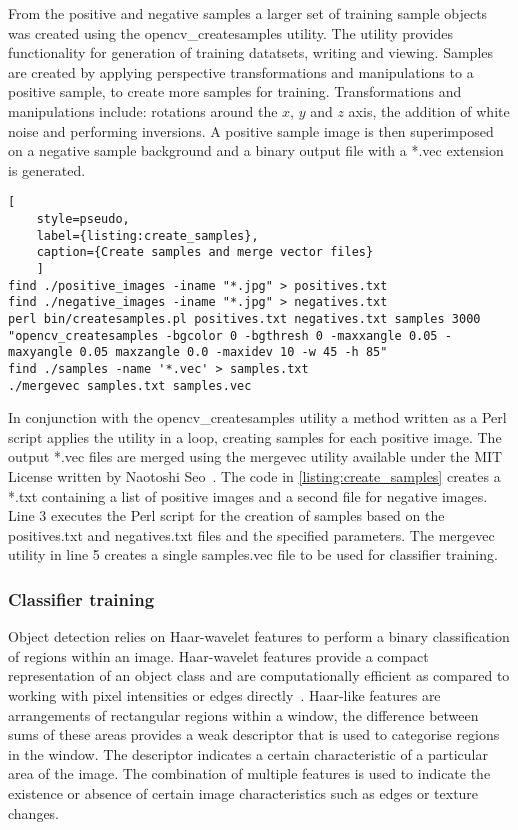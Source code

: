 From the positive and negative samples a larger set of training sample objects was created using the opencv\_createsamples utility. The utility provides functionality for generation of training datatsets, writing and viewing. Samples are created by applying perspective transformations and manipulations to a positive sample, to create more samples for training. Transformations and  manipulations include: rotations around the $x$, $y$ and $z$ axis, the addition of white noise and performing inversions. A positive sample image is then superimposed on a negative sample background and a binary output file with a *.vec extension is generated.

\begin{lstlisting}[
	style=pseudo,
	label={listing:create_samples},
	caption={Create samples and merge vector files}
	]
find ./positive_images -iname "*.jpg" > positives.txt
find ./negative_images -iname "*.jpg" > negatives.txt
perl bin/createsamples.pl positives.txt negatives.txt samples 3000 "opencv_createsamples -bgcolor 0 -bgthresh 0 -maxxangle 0.05 -maxyangle 0.05 maxzangle 0.0 -maxidev 10 -w 45 -h 85"
find ./samples -name '*.vec' > samples.txt
./mergevec samples.txt samples.vec
\end{lstlisting}

In conjunction with the opencv\_createsamples utility a method written as a Perl script applies the utility in a loop, creating samples for each positive image. The output *.vec files are merged using the mergevec utility available under the MIT License written by Naotoshi Seo~\cite{Seo}. The code in \autoref{listing:create_samples} creates a *.txt containing a list of positive images and a second file for negative images. Line 3 executes the Perl script for the creation of samples based on the positives.txt and negatives.txt files and the specified parameters. The mergevec utility in line 5 creates a single samples.vec file to be used for classifier training.

\subsubsection{Classifier training}
Object detection relies on Haar-wavelet features to perform a binary classification of regions within an image. Haar-wavelet features provide a compact representation of an object class and are computationally efficient as compared to working with pixel intensities or edges directly~\cite{Papageorgiou1998}. Haar-like features are arrangements of rectangular regions within a window, the difference between sums of these areas provides a weak descriptor that is used to categorise regions in the window. The descriptor indicates a certain characteristic of a particular area of the image. The combination of multiple features is used to indicate the existence or absence of certain image characteristics such as edges or texture changes.


